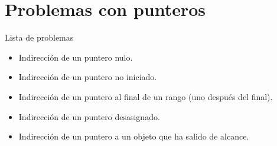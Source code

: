 \section{Problemas con punteros}

\begin{frame}[t]{Lista de problemas}
\begin{itemize}
  \item Indirección de un puntero nulo.
  \item Indirección de un puntero no iniciado.
  \item Indirección de un puntero al final de un rango (uno después del final).
  \item Indirección de un puntero desasignado.
  \item Indirección de un puntero a un objeto que ha salido de alcance.
\end{itemize}
\end{frame}
